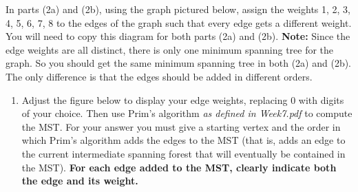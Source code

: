 \documentclass[12pt,letterpaper]{article}
\makeatletter
\theoremstyle{definition}
\newcounter{dummy}
\newcommand\myitem[1][]{\item[#1]\refstepcounter{dummy}\def\@currentlabel{#1}}
\newcommand{\problemend}{\par\noindent{\hspace{0.15\textwidth}\rule{0.7\textwidth}{0.5pt}\hspace{0.15\textwidth}}\par}
\makeatother
\begin{document}
In parts (2a) and (2b), using the graph pictured below, assign the weights 1, 2, 3, 4, 5, 6, 7, 8 to the edges of the graph such that every edge gets a different weight. You will need to copy this diagram for both parts (2a) and (2b). \textbf{Note:} Since the edge weights are all distinct, there is only one minimum spanning tree for the graph. So you should get the same minimum spanning tree in both (2a) and (2b). The only difference is that the edges should be added in different orders.
\problemend{}


\begin{center}
\end{center}


\clearpage
\begin{enumerate}
	\myitem[(2a)]\label{2a} 
	Adjust the figure below to display your edge weights, replacing 0 with digits of your choice. Then use Prim's algorithm \emph{as defined in Week7.pdf} to compute the MST\@. For your answer you must give a starting vertex and the order in which Prim's algorithm adds the edges to the MST (that is, adds an edge to the current intermediate spanning forest that will eventually be contained in the MST)\@. \textbf{For each edge added to the MST, clearly indicate both the edge and its weight.}
\end{enumerate}
\end{document}
